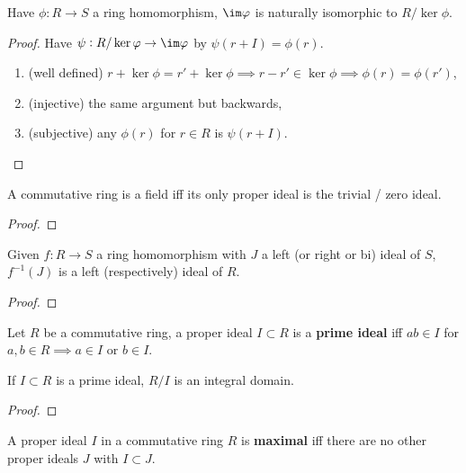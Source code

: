 \documentclass{report}
\begin{document}
\begin{theorem}\label{iso}
    Have $\phi:R\rightarrow S$ a ring homomorphism, $\im\phi$ is naturally isomorphic to $R/\ker\phi$.
    \begin{proof}
        Have $\psi:R/\ker\phi\rightarrow\im\phi$ by $\psi(r+I)=\phi(r)$. \begin{enumerate}
            \item[](well defined) $r+\ker\phi=r'+\ker\phi\implies r-r'\in\ker\phi\implies\phi(r)=\phi(r')$,
            \item[](injective) the same argument but backwards,
            \item[](subjective) any $\phi(r)$ for $r\in R$ is $\psi(r+I)$.\vspace{-20pt}
        \end{enumerate}
    \end{proof}
\end{theorem}

\begin{proposition}
    A commutative ring is a field iff its only proper ideal is the trivial / zero ideal.
    \begin{proof}
        
    \end{proof}
\end{proposition}

\begin{proposition}
    Given $f:R\rightarrow S$ a ring homomorphism with $J$ a left (or right or bi) ideal of $S$, $f^{-1}(J)$ is a left (respectively) ideal of $R$.
    \begin{proof}
        
    \end{proof}
\end{proposition}

\begin{definition}
    Let $R$ be a commutative ring, a proper ideal $I\subset R$ is a \textbf{prime ideal} iff $ab\in I$ for $a,b\in R \implies a\in I$ or $b\in I$.
\end{definition}

\begin{theorem}
    If $I\subset R$ is a prime ideal, $R/I$ is an integral domain.
    \begin{proof}
        
    \end{proof}
\end{theorem}

\begin{definition}
    A proper ideal $I$ in a commutative ring $R$ is \textbf{maximal} iff there are no other proper ideals $J$ with $I\subset J$.
\end{definition}
\end{document}

